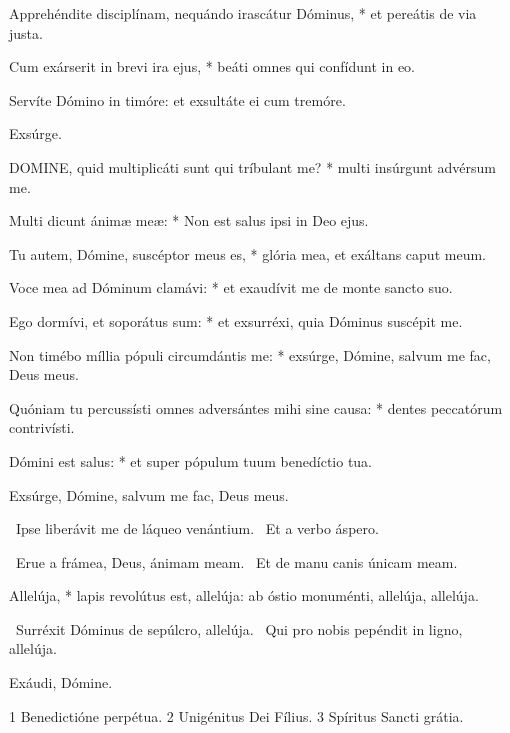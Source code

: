 Apprehéndite disciplínam, nequándo irascátur Dóminus, * et pereátis de via justa.

Cum exárserit in brevi ira ejus, * beáti omnes qui confídunt in eo.

 Servíte Dómino in timóre: et exsultáte ei cum tremóre.

 Exsúrge.


\lettrine[lines=2]{D}{OMINE}, quid multiplicáti sunt qui tríbulant me? * multi insúrgunt advérsum me.

Multi dicunt ánimæ meæ: * Non est salus ipsi in Deo ejus.

Tu autem, Dómine, suscéptor meus es, * glória mea, et exáltans caput meum.

Voce mea ad Dóminum clamávi: * et exaudívit me de monte sancto suo.

Ego dormívi, et soporátus sum: * et exsurréxi, quia Dóminus suscépit me.

Non timébo míllia pópuli circumdántis me: * exsúrge, Dómine, salvum me fac, Deus meus.

Quóniam tu percussísti omnes adversántes mihi sine causa: * dentes peccatórum contrivísti.

Dómini est salus: * et super pópulum tuum benedíctio tua.


 Exsúrge, Dómine, salvum me fac, Deus meus.


\V\ Ipse liberávit me de láqueo venántium. \R\ Et a verbo áspero.


\V\ Erue a frámea, Deus, ánimam meam. \R\ Et de manu canis únicam meam.


 Allelúja, * lapis revolútus est, allelúja: ab óstio monuménti, allelúja, allelúja.

\V\ Surréxit Dóminus de sepúlcro, allelúja. \R\ Qui pro nobis pepéndit in ligno, allelúja.

 Exáudi, Dómine.

 1 Benedictióne perpétua. 2 Unigénitus Dei Fílius. 3 Spíritus Sancti grátia.



